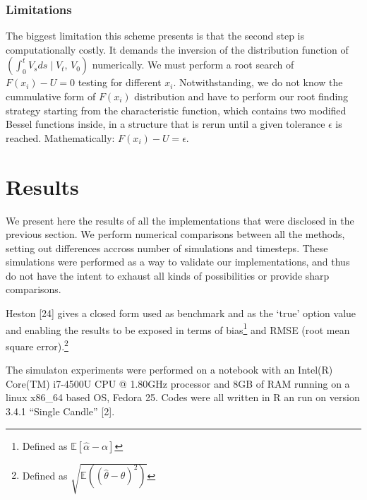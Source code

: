 \documentclass[12pt,oneside]{reedthesis}
\theoremstyle{definition}
\theoremstyle{definition}
\theoremstyle{remark}
\begin{document}
  \subsection{Limitations}\label{limitations-1}
  
  The biggest limitation this scheme presents is that the second step is
  computationally costly. It demands the inversion of the distribution
  function of
  \(\left( \displaystyle \int_0^t V_sds \mid V_t, \, V_0 \right)\)
  numerically. We must perform a root search of \(F(x_i) - U = 0\) testing
  for different \(x_i\). Notwithstanding, we do not know the cummulative
  form of \(F(x_i)\) distribution and have to perform our root finding
  strategy starting from the characteristic function, which contains two
  modified Bessel functions inside, in a structure that is rerun until a
  given tolerance \(\epsilon\) is reached. Mathematically:
  \(F(x_i) - U = \epsilon\).
  
  \chapter{Results}\label{resultados}
  
  We present here the results of all the implementations that were
  disclosed in the previous section. We perform numerical comparisons
  between all the methods, setting out differences accross number of
  simulations and timesteps. These simulations were performed as a way to
  validate our implementations, and thus do not have the intent to exhaust
  all kinds of possibilities or provide sharp comparisons.
  
  Heston {[}24{]} gives a closed form used as benchmark and as the `true'
  option value and enabling the results to be exposed in terms of
  bias\footnote{Defined as
    \(\mathbb{E} \left[ \hat{\alpha} - \alpha \right]\)} and RMSE (root
  mean square error).\footnote{Defined as
    \(\sqrt{\mathbb{E}((\hat{\theta}-\theta)^2)}\)}
  
  The simulaton experiments were performed on a notebook with an Intel(R)
  Core(TM) i7-4500U CPU @ 1.80GHz processor and 8GB of RAM running on a
  linux x86\_64 based OS, Fedora 25. Codes were all written in R an run on
  version 3.4.1 ``Single Candle'' {[}2{]}.
  
\end{document}
